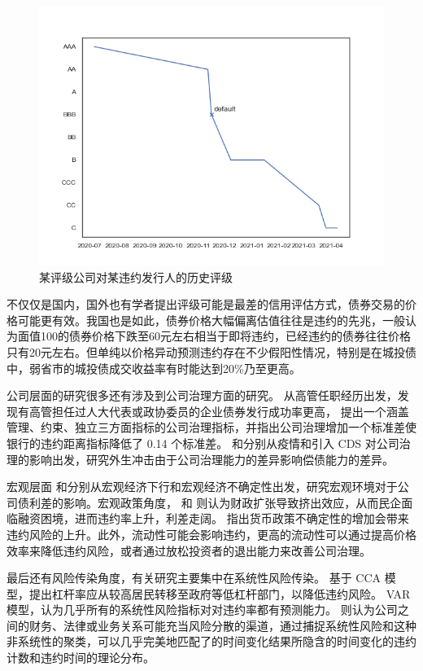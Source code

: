 \begin{figure}[h]
	\centering
	\includegraphics[width=0.9\linewidth]{./data/rating_of_zg.png}
	\caption{某评级公司对某违约发行人的历史评级}
	\label{fig:rating_of_zg}
\end{figure}
不仅仅是国内，国外也有学者提出评级可能是最差的信用评估方式\cite{blochlinger2018ratings}，债券交易的价格可能更有效\cite{badoer2019relevance}。我国也是如此，债券价格大幅偏离估值往往是违约的先兆，一般认为面值100的债券价格下跌至60元左右相当于即将违约，已经违约的债券往往价格只有20元左右。但单纯以价格异动预测违约存在不少假阳性情况，特别是在城投债中，弱省市的城投债成交收益率有时能达到20\%乃至更高。

公司层面的研究很多还有涉及到公司治理方面的研究。
\Textcite{林晚发2018高管任职经历的得与失}从高管任职经历出发，发现有高管担任过人大代表或政协委员的企业债券发行成功率更高，
\Textcite{anginer2018corporate}提出一个涵盖管理、约束、独立三方面指标的公司治理指标，并指出公司治理增加一个标准差使银行的违约距离指标降低了 0.14 个标准差。
\Textcite{ding2021corporate}和\Textcite{subrahmanyam2017credit}分别从疫情和引入 CDS 对公司治理的影响出发，研究外生冲击由于公司治理能力的差异影响偿债能力的差异。

宏观层面
\Textcite{bai2019common}和\Textcite{bali2021macroeconomic}分别从宏观经济下行和宏观经济不确定性出发，研究宏观环境对于公司债利差的影响。宏观政策角度，
\Textcite{梅冬州2021财政扩张}和\Textcite{2020Fiscal} 则认为财政扩张导致挤出效应，从而民企面临融资困境，进而违约率上升，利差走阔。
\Textcite{王博2019货币政策不确定性}指出货币政策不确定性的增加会带来违约风险的上升。此外，流动性可能会影响违约\cite{brogaard2017stock}，更高的流动性可以通过提高价格效率来降低违约风险，或者通过放松投资者的退出能力来改善公司治理。

最后还有风险传染角度，有关研究主要集中在系统性风险传染。
\Textcite{苟文均2016债务杠杆与系统性风险传染机制}基于 CCA 模型，提出杠杆率应从较高居民转移至政府等低杠杆部门，以降低违约风险。
\Textcite{2020Do} VAR 模型，认为几乎所有的系统性风险指标对对违约率都有预测能力。
\Textcite{azizpour2018exploring}则认为公司之间的财务、法律或业务关系可能充当风险分散的渠道，通过捕捉系统性风险和这种非系统性的聚类，可以几乎完美地匹配了的时间变化结果所隐含的时间变化的违约计数和违约时间的理论分布。
